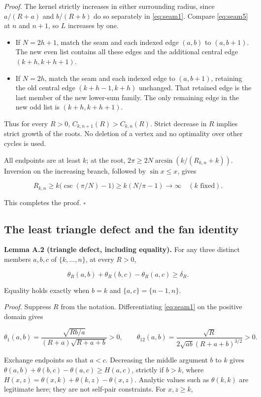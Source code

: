 \emph{Proof.} The kernel strictly increases in either surrounding radius, since
$a/(R+a)$ and $b/(R+b)$ do so separately in \eqref{eq:seam1}.
Compare \eqref{eq:seam5} at $n$ and $n+1$, so $L$ increases by one.

\begin{itemize}
\item If $N=2h+1$, match the seam and each indexed edge $(a,b)$ to
$(a,b+1)$. The new even list contains all these edges and the
additional central edge $(k+h,k+h+1)$.
\item If $N=2h$, match the seam and each indexed edge to $(a,b+1)$,
retaining the old central edge $(k+h-1,k+h)$ unchanged. That retained
edge is the last member of the new lower-sum family. The only remaining
edge in the new odd list is $(k+h,k+h+1)$.
\end{itemize}

Thus for every $R>0$, $C_{k,n+1}(R)>C_{k,n}(R)$. Strict decrease
in $R$ implies strict growth of the roots. No deletion of a vertex and
no optimality over other cycles is used.

All endpoints are at least $k$; at the root,
$2\pi\ge2N\arcsin(k/(R_{k,n}+k))$. Inversion on the increasing
branch, followed by $\sin x\le x$, gives

\[
 R_{k,n}\ge k\bigl(\csc(\pi/N)-1\bigr)
             \ge k(N/\pi-1)\longrightarrow\infty
 \quad (k\text{ fixed}). \tag{A.6}\label{eq:seam6}
\]

This completes the proof. \hfill$\square$

\subsection{The least triangle defect and the fan identity}

\textbf{Lemma A.2 (triangle defect, including equality).} For any three distinct
members $a,b,c$ of $\{k,\ldots,n\}$, at every $R>0$,

\[
 \theta_R(a,b)+\theta_R(b,c)-\theta_R(a,c)\ge\delta_R.
 \tag{A.7}\label{eq:seam7}
\]

Equality holds exactly when $b=k$ and $\{a,c\}=\{n-1,n\}$.

\emph{Proof.} Suppress $R$ from the notation. Differentiating \eqref{eq:seam1} on the
positive domain gives

\[
 \theta_1(a,b)=\frac{\sqrt{Rb/a}}{(R+a)\sqrt{R+a+b}}>0,\qquad
 \theta_{12}(a,b)=\frac{\sqrt R}{2\sqrt{ab}(R+a+b)^{3/2}}>0.
 \tag{A.8}\label{eq:seam8}
\]

Exchange endpoints so that $a<c$. Decreasing the middle argument
$b$ to $k$ gives
$\theta(a,b)+\theta(b,c)-\theta(a,c)\ge H(a,c)$, strictly if
$b>k$, where $H(x,z)=\theta(x,k)+\theta(k,z)-\theta(x,z)$.
Analytic values such as $\theta(k,k)$ are legitimate here; they are
not self-pair constraints. For $x,z\ge k$,

